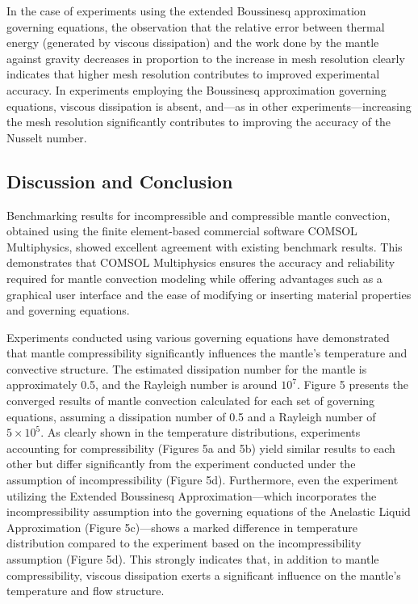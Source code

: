 In the case of experiments using the extended Boussinesq approximation governing equations, the observation that the relative error between thermal energy (generated by viscous dissipation) and the work done by the mantle against gravity decreases in proportion to the increase in mesh resolution clearly indicates that higher mesh resolution contributes to improved experimental accuracy. In experiments employing the Boussinesq approximation governing equations, viscous dissipation is absent, and—as in other experiments—increasing the mesh resolution significantly contributes to improving the accuracy of the Nusselt number.

\subsection{Discussion and Conclusion}




Benchmarking results for incompressible and compressible mantle convection, obtained using the finite element-based commercial software COMSOL Multiphysics, showed excellent agreement with existing benchmark results. This demonstrates that COMSOL Multiphysics ensures the accuracy and reliability required for mantle convection modeling while offering advantages such as a graphical user interface and the ease of modifying or inserting material properties and governing equations.

Experiments conducted using various governing equations have demonstrated that mantle compressibility significantly influences the mantle's temperature and convective structure. The estimated dissipation number for the mantle is approximately 0.5, and the Rayleigh number is around $10^7$. Figure 5 presents the converged results of mantle convection calculated for each set of governing equations, assuming a dissipation number of 0.5 and a Rayleigh number of $5 \times 10^5$. As clearly shown in the temperature distributions, experiments accounting for compressibility (Figures 5a and 5b) yield similar results to each other but differ significantly from the experiment conducted under the assumption of incompressibility (Figure 5d). Furthermore, even the experiment utilizing the Extended Boussinesq Approximation—which incorporates the incompressibility assumption into the governing equations of the Anelastic Liquid Approximation (Figure 5c)—shows a marked difference in temperature distribution compared to the experiment based on the incompressibility assumption (Figure 5d). This strongly indicates that, in addition to mantle compressibility, viscous dissipation exerts a significant influence on the mantle's temperature and flow structure.

